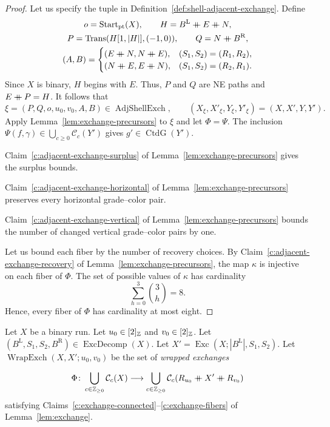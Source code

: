 \begin{proof}
 Let us specify the tuple in Definition~\ref{def:shell-adjacent-exchange}.
Define
\[
\begin{gathered}
 o=\operatorname{Start}_{\mathrm{pt}}(X),\qquad H=B^{\mathrm L}\ccn E\ccn N,\\
 P=\operatorname{Trans}(H[1,|H|],(-1,0)),\qquad Q=N\ccn B^{\mathrm R},\\
 (A,B)=
 \begin{cases}
 (E\ccn N,N\ccn E),&(S_1,S_2)=(R_1,R_2),\\
 (N\ccn E,E\ccn N),&(S_1,S_2)=(R_2,R_1).
 \end{cases}
\end{gathered}
\]
Since $X$ is binary, $H$ begins with $E$.
Thus, $P$ and $Q$ are NE paths and $E\mathbin{+\mkern-10mu+} P=H$.
It follows that
\[
 \xi=(P,Q,o,u_0,v_0,A,B)\in\operatorname{AdjShellExch},\qquad
 (X_\xi,X'_\xi,Y_\xi,Y'_\xi)=(X,X',Y,Y').
\]
Apply Lemma~\ref{lem:exchange-precursors} to $\xi$ and let $\Phi=\Psi$.
The inclusion $\Psi(f,\gamma)\in\bigcup_{c\ge0}\mathcal C_c(Y')$ gives $g'\in\operatorname{CtdG}(Y')$.

Claim~\ref{c:adjacent-exchange-surplus} of Lemma~\ref{lem:exchange-precursors} gives the surplus bounds.

Claim~\ref{c:adjacent-exchange-horizontal} of Lemma~\ref{lem:exchange-precursors} preserves every horizontal grade--color pair.

Claim~\ref{c:adjacent-exchange-vertical} of Lemma~\ref{lem:exchange-precursors} bounds the number of changed vertical grade--color pairs by one.

 Let us bound each fiber by the number of recovery choices.
By Claim~\ref{c:adjacent-exchange-recovery} of Lemma~\ref{lem:exchange-precursors},
the map $\kappa$ is injective on each fiber of $\Phi$.
The set of possible values of $\kappa$ has cardinality
\[
 \sum_{h=0}^{3}\binom3h=8.
\]
Hence, every fiber of $\Phi$ has cardinality at most eight.
\end{proof}
\begin{definition}\label{def:wrapped-exchange}
Let $X$ be a binary run. Let $u_0\in[2]_{\mathbb Z}$ and $v_0\in[2]_{\mathbb Z}$.
Let $(B^{\mathrm L},S_1,S_2,B^{\mathrm R})\in\operatorname{ExcDecomp}(X)$.
Let $X'=\operatorname{Exc}(X;|B^{\mathrm L}|,S_1,S_2)$.
Let $\operatorname{WrapExch}(X,X';u_0,v_0)$ be the set of \textit{wrapped exchanges}

\[
 \Phi\colon\bigcup_{c\in\mathbb Z_{\ge0}}\mathcal C_c(X)
 \longrightarrow\bigcup_{c\in\mathbb Z_{\ge0}}\mathcal C_c(R_{u_0}\mathbin{+\mkern-10mu+} X'\mathbin{+\mkern-10mu+} R_{v_0})
\]
satisfying Claims~\ref{c:exchange-connected}--\ref{c:exchange-fibers}
of Lemma~\ref{lem:exchange}.
\end{definition}




